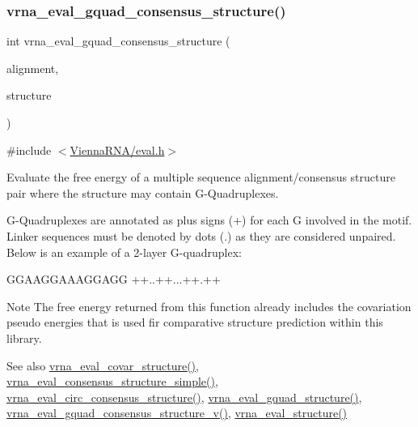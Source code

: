 \subsubsection{\texorpdfstring{vrna\+\_\+eval\+\_\+gquad\+\_\+consensus\+\_\+structure()}{vrna\_eval\_gquad\_consensus\_structure()}}
{\footnotesize\ttfamily int vrna\+\_\+eval\+\_\+gquad\+\_\+consensus\+\_\+structure (\begin{DoxyParamCaption}\item[{const char $\ast$$\ast$}]{alignment,  }\item[{const char $\ast$}]{structure }\end{DoxyParamCaption})}



{\ttfamily \#include $<$\mbox{\hyperlink{eval_8h}{Vienna\+R\+N\+A/eval.\+h}}$>$}



Evaluate the free energy of a multiple sequence alignment/consensus structure pair where the structure may contain G-\/\+Quadruplexes. 

G-\/\+Quadruplexes are annotated as plus signs (\textquotesingle{}+\textquotesingle{}) for each G involved in the motif. Linker sequences must be denoted by dots (\textquotesingle{}.\textquotesingle{}) as they are considered unpaired. Below is an example of a 2-\/layer G-\/quadruplex\+: 
\begin{DoxyCode}
GGAAGGAAAGGAGG
++..++...++.++
\end{DoxyCode}


\begin{DoxyNote}{Note}
The free energy returned from this function already includes the covariation pseudo energies that is used fir comparative structure prediction within this library.
\end{DoxyNote}
\begin{DoxySeeAlso}{See also}
\mbox{\hyperlink{group__eval_ga6cea75c0eb9857fb59172be54cab09e0}{vrna\+\_\+eval\+\_\+covar\+\_\+structure()}}, \mbox{\hyperlink{group__eval_ga7762c3a7bdcbc3a14ef93259d322c7d6}{vrna\+\_\+eval\+\_\+consensus\+\_\+structure\+\_\+simple()}}, \mbox{\hyperlink{group__eval_gac96577cf232c71160f762737a994b7c6}{vrna\+\_\+eval\+\_\+circ\+\_\+consensus\+\_\+structure()}}, \mbox{\hyperlink{group__eval_ga3263504825ef4b523eba797c99921df4}{vrna\+\_\+eval\+\_\+gquad\+\_\+structure()}}, \mbox{\hyperlink{group__eval_ga8abc794fc48d43268ced5e8cde017baa}{vrna\+\_\+eval\+\_\+gquad\+\_\+consensus\+\_\+structure\+\_\+v()}}, \mbox{\hyperlink{group__eval_ga58f199f1438d794a265f3b27fc8ea631}{vrna\+\_\+eval\+\_\+structure()}}
\end{DoxySeeAlso}

